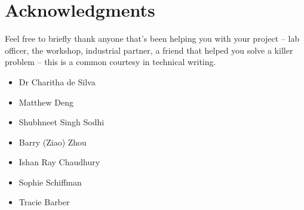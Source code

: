 \section*{Acknowledgments}

Feel free to briefly thank anyone that’s been helping you with your project – lab officer, the workshop, industrial partner, a friend that helped you solve a killer problem – this is a common courtesy in technical writing.

\begin{itemize}
    \item Dr Charitha de Silva
    \item Matthew Deng
    \item Shubhneet Singh Sodhi
    \item Barry (Ziao) Zhou
    \item Ishan Ray Chaudhury
    \item Sophie Schiffman
    \item Tracie Barber
\end{itemize}

\pagebreak
